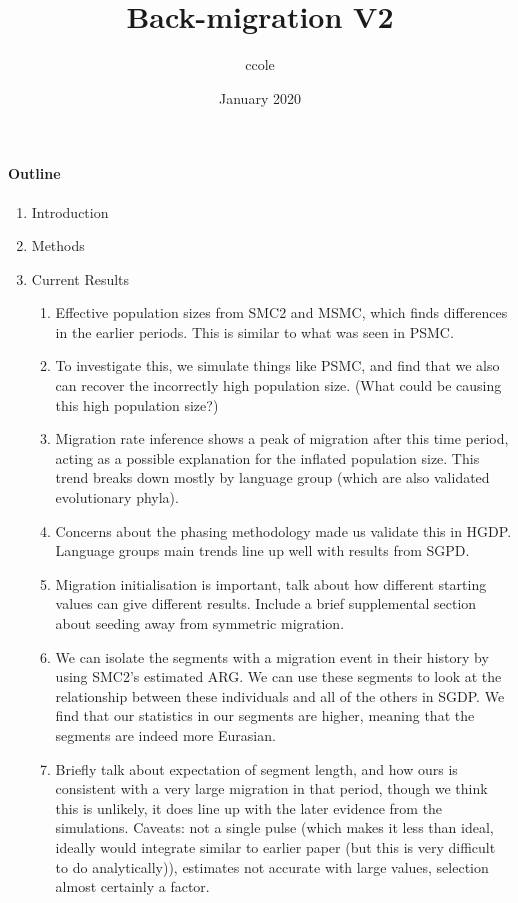 \documentclass{article}
\title{Back-migration V2}
\author{ccole }
\date{January 2020}
\begin{document}
\maketitle

\paragraph{Outline}
\begin{enumerate}
    \item Introduction
    \item Methods
    \item Current Results 
    \begin{enumerate}
        \item Effective population sizes from SMC2 and MSMC, which finds differences in the earlier periods. This is similar to what was seen in PSMC.
        \item To investigate this, we simulate things like PSMC, and find that we also can recover the incorrectly high population size. (What could be causing this high population size?)
        \item Migration rate inference shows a peak of migration after this time period, acting as a possible explanation for the inflated population size. This trend breaks down mostly by language group (which are also validated evolutionary phyla). 
        \item Concerns about the phasing methodology made us validate this in HGDP. Language groups main trends line up well with results from SGPD.
        \item Migration initialisation is important, talk about how different starting values can give different results. Include a brief supplemental section about seeding away from symmetric migration.
        \item We can isolate the segments with a migration event in their history by using SMC2's estimated ARG. We can use these segments to look at the relationship between these individuals and all of the others in SGDP. We find that our statistics in our segments are higher, meaning that the segments are indeed more Eurasian.
        \item Briefly talk about expectation of segment length, and how ours is consistent with a very large migration in that period, though we think this is unlikely, it does line up with the later evidence from the simulations. Caveats: not a single pulse (which makes it less than ideal, ideally would integrate similar to earlier paper (but this is very difficult to do analytically)), estimates not accurate with large values, selection almost certainly a factor.

\end{enumerate}
\end{enumerate}
\end{document}
